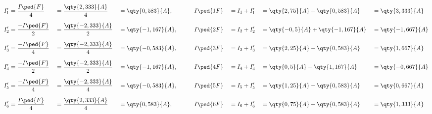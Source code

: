 \begin{exemple}
	\begin{alignat*}{7}
		I_1' &= \frac{I\ped{F}}{4} &&=\frac{\qty{2,333}{A}}{4} &&= \qty{0,583}{A}, &&\qquad I\ped{1F} && = I_1 + I_1' &&= \qty{2,75}{A}+\qty{0,583}{A} &&= \qty{3,333}{A} \\[1.5ex]
		I_2' &= \frac{-I\ped{F}}{2} &&=\frac{\qty{-2,333}{A}}{2} &&= \qty{-1,167}{A}, &&\qquad I\ped{2F} && = I_2 + I_2' &&= \qty{-0,5}{A}+\qty{-1,167}{A} &&= \qty{-1,667}{A} \\[1.5ex]
		I_3' &= \frac{-I\ped{F}}{4} &&=\frac{\qty{-2,333}{A}}{4} &&= \qty{-0,583}{A}, &&\qquad I\ped{3F} && = I_3 + I_3' &&= \qty{2,25}{A}-\qty{0,583}{A} &&= \qty{1,667}{A} \\[1.5ex]
		I_4' &= \frac{-I\ped{F}}{2} &&=\frac{\qty{-2,333}{A}}{2} &&= \qty{-1,167}{A}, &&\qquad I\ped{4F} && = I_4 + I_4' &&= \qty{0,5}{A}-\qty{1,167}{A} &&= \qty{-0,667}{A} \\[1.5ex]
		I_5' &= \frac{-I\ped{F}}{4} &&=\frac{\qty{-2,333}{A}}{4} &&= \qty{-0,583}{A}, &&\qquad I\ped{5F} && = I_5 + I_5' &&= \qty{1,25}{A}-\qty{0,583}{A} &&= \qty{0,667}{A} \\[1.5ex]
		I_6' &= \frac{I\ped{F}}{4}  &&=\frac{\qty{2,333}{A}}{4} &&= \qty{0,583}{A}, &&\qquad I\ped{6F} && = I_6 + I_6' &&= \qty{0,75}{A}+\qty{0,583}{A} &&= \qty{1,333}{A}
	\end{alignat*}
\end{exemple}

